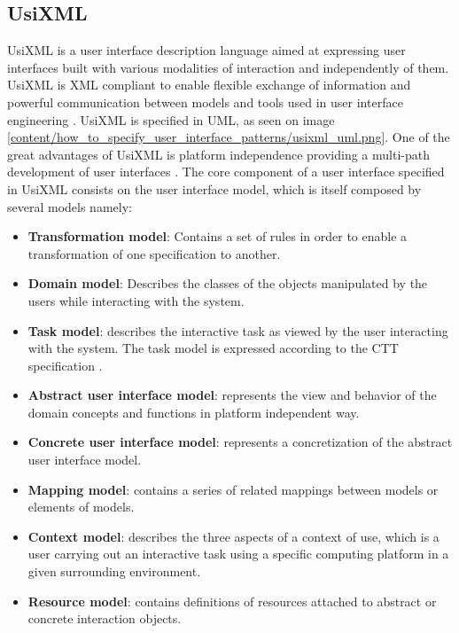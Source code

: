 \subsection{UsiXML}
\label{subsection:UsiXML}
UsiXML is a user interface description language aimed at expressing user interfaces built with various modalities of interaction and independently of them. UsiXML is XML compliant to enable flexible exchange of information and powerful communication between models and tools used in user interface engineering \cite{UsiXML_USer_Interface_eXtensible_Markup_Language}. UsiXML is specified in UML, as seen on image \ref{content/how_to_specify_user_interface_patterns/usixml_uml.png}. One of the great advantages of UsiXML is platform independence providing a multi-path development of user interfaces \cite{UsiXML_a_Language_Supporting_Multi-Path_Development_of_User_Interfaces}.
The core component of a user interface specified in UsiXML consists on the user interface model, which is itself composed by several models namely:
\begin{itemize}
\item \textbf{Transformation model}:  Contains a set of rules in order to enable a transformation of one specification to another.
\item \textbf{Domain model}: Describes the classes of the objects manipulated by the users while interacting with the system.
\item \textbf{Task model}: describes the interactive task as viewed by the user interacting with the system. The task model is expressed according to the CTT specification \cite{ConcurTaskTrees_A_Diagrammatic_Notation_for_Specifying_Task_Models}.
\item \textbf{Abstract user interface model}: represents the view and behavior of the domain concepts and functions in platform independent way.
\item \textbf{Concrete user interface model}: represents a concretization of the abstract user interface model.
\item \textbf{Mapping model}: contains a series of related mappings between models or elements of models.
\item \textbf{Context model}: describes the three aspects of a context of use, which is a user carrying out an interactive task using a specific computing platform in a given surrounding environment.
\item \textbf{Resource model}: contains definitions of resources attached to abstract or concrete interaction objects.
\end{itemize}

